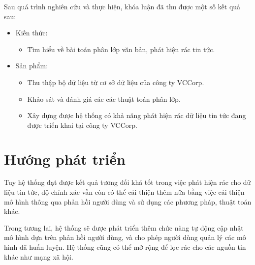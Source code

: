 Sau quá trình nghiên cứu và thực hiện, khóa luận đã thu được một số kết quả sau:
	\begin{itemize}
		\item Kiến thức:
		\begin{itemize}
			\item Tìm hiểu về bài toán phân lớp văn bản, phát hiện rác tin tức.
		\end{itemize}
		
		\item Sản phẩm:
		\begin{itemize}
			\item Thu thập bộ dữ liệu từ cơ sở dữ liệu của công ty VCCorp.
			\item Khảo sát và đánh giá các các thuật toán phân lớp.
			\item Xây dựng được hệ thống có khả năng phát hiện rác dữ liệu tin tức đang được triển khai tại công ty VCCorp.
		\end{itemize}
	\end{itemize}

\section*{Hướng phát triển}
Tuy hệ thống đạt được kết quả tương đối khá tốt trong việc phát hiện rác cho dữ liệu tin tức, độ chính xác vẫn còn có thể cải thiện thêm nữa bằng việc cải thiện mô hình thông qua phản hồi người dùng và sử dụng các phương pháp, thuật toán khác.

Trong tương lai, hệ thống sẽ được phát triển thêm chức năng tự động cập nhật mô hình dựa trên phản hồi người dùng, và cho phép người dùng quản lý các mô hình đã huấn luyện. Hệ thống cũng có thể mở rộng để lọc rác cho các nguồn tin khác như mạng xã hội.
